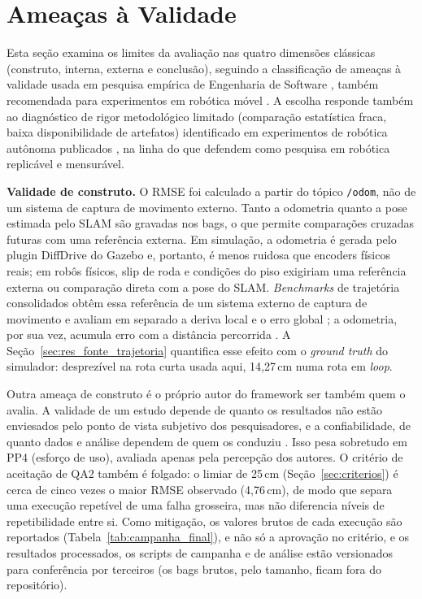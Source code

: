 \section{Ameaças à Validade}
\label{sec:ameacas}

Esta seção examina os limites da avaliação nas quatro dimensões clássicas
(construto, interna, externa e conclusão), seguindo a classificação de ameaças
à validade usada em pesquisa empírica de Engenharia de Software
\cite{wohlin2012, runeson2009}, também recomendada para experimentos em
robótica móvel \cite{amigoni2010}. A escolha responde também ao
diagnóstico de rigor metodológico limitado (comparação estatística fraca,
baixa disponibilidade de artefatos) identificado em experimentos de
robótica autônoma publicados \cite{amigoni2014}, na linha do que
 defendem como pesquisa em robótica replicável e
mensurável.

\textbf{Validade de construto.} O RMSE foi calculado a partir do tópico
\texttt{/\allowbreak odom}, não de um sistema de captura de movimento externo. Tanto a
odometria quanto a pose estimada pelo SLAM são gravadas nos bags, o que permite
comparações cruzadas futuras com uma referência externa. Em simulação, a
odometria é gerada pelo plugin DiffDrive do Gazebo e, portanto, é menos ruidosa
que encoders físicos reais; em robôs físicos, slip de roda e condições do piso
exigiriam uma referência externa ou comparação direta com a pose do SLAM.
\textit{Benchmarks} de trajetória consolidados obtêm essa referência de um
sistema externo de captura de movimento e avaliam em separado a deriva local
e o erro global \cite{sturm2012}; a odometria, por sua vez, acumula erro com
a distância percorrida \cite{borenstein1996}. A
Seção~\ref{sec:res_fonte_trajetoria} quantifica esse efeito com o
\textit{ground truth} do simulador: desprezível na rota curta usada aqui,
14,27\,cm numa rota em \textit{loop}.

Outra ameaça de construto é o próprio autor do framework ser também
quem o avalia. A validade de um estudo depende de quanto os resultados não
estão enviesados pelo ponto de vista subjetivo dos pesquisadores, e a
confiabilidade, de quanto dados e análise dependem de quem os conduziu
\cite{runeson2009}. Isso pesa sobretudo em PP4 (esforço de uso), avaliada
apenas pela percepção dos autores. O critério de aceitação de QA2 também é
folgado: o limiar de 25\,cm (Seção~\ref{sec:criterios}) é cerca de cinco
vezes o maior RMSE observado (4,76\,cm), de modo que separa uma execução
repetível de uma falha grosseira, mas não diferencia níveis de repetibilidade
entre si. Como mitigação, os valores brutos de cada execução são reportados
(Tabela~\ref{tab:campanha_final}), e não só a aprovação no critério, e os
resultados processados, os scripts de campanha e de análise estão versionados
para conferência por terceiros \cite{acm2020badging} (os bags brutos, pelo tamanho, ficam fora do
repositório).

